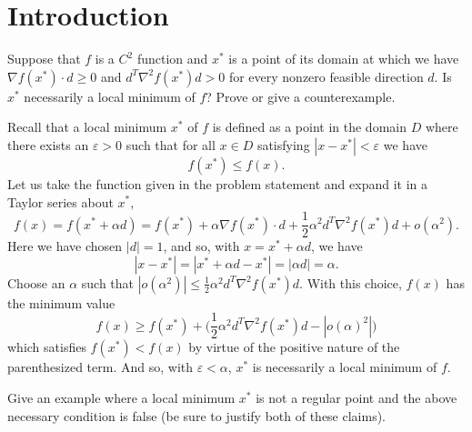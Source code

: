 \documentclass[../calculus-of-variations-and-optimal-control-theory.tex]{subfiles}
\begin{document}
\printanswers

\section{Introduction}

\begin{questions}

\question Suppose that $f$ is a $C^2$ function and $x^*$ is a point of its domain at which we have $\nabla f(x^*)\cdot d \geq 0$ and $d^T\nabla^2f(x^*)d > 0$ for every nonzero feasible direction $d$. Is $x^*$ necessarily a local minimum of $f$? Prove or give a counterexample.

\begin{solution}
	Recall that a local minimum $x^*$ of $f$ is defined as a point in the domain $D$ where there exists an $\varepsilon>0$ such that for all $x\in D$ satisfying $|x - x^*| < \varepsilon$ we have
	\[
		f(x^*) \leq f(x).
	\]
	Let us take the function given in the problem statement and expand it in a Taylor series about $x^*$,
	\[
		f(x) = f(x^* + \alpha d) = f(x^*) + \alpha\nabla f(x^*)\cdot d + \frac{1}{2}\alpha^2d^T\nabla^2 f(x^*)d + o(\alpha^2).
	\]
	Here we have chosen $|d| = 1$, and so, with $x = x^* + \alpha {d}$, we have
	\[
		|x - x^*| = |x^* + \alpha{d} - x^*| = |\alpha d| = \alpha.
	\]
	Choose an $\alpha$ such that $|o(\alpha^2)| \leq \frac{1}{2}\alpha^2d^T\nabla^2 f(x^*)d$. With this choice, $f(x)$ has the minimum value 
	\[
		f(x) \geq f(x^*) + \Big(\frac{1}{2}\alpha^2d^T\nabla^2 f(x^*)d - |o(\alpha)^2|\Big)
	\]
	which satisfies $f(x^*) < f(x)$ by virtue of the positive nature of the parenthesized term. And so, with $\varepsilon < \alpha$, $x^*$ is necessarily a local minimum of $f$.
\end{solution}

\question Give an example where a local minimum $x^*$ is not a regular point and the above necessary condition is false (be sure to justify both of these claims).


\end{questions}
\end{document}
